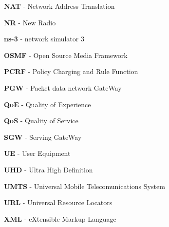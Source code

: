 \textbf{NAT} - Network Address Translation

\textbf{NR} - New Radio

\textbf{ns-3} - network simulator 3

\textbf{OSMF} - Open Source Media Framework

\textbf{PCRF} - Policy Charging and Rule Function

\textbf{PGW} - Packet data network GateWay

\textbf{QoE} - Quality of Experience

\textbf{QoS} - Quality of Service

\textbf{SGW} - Serving GateWay

\textbf{UE} - User Equipment

\textbf{UHD} - Ultra High Definition

\textbf{UMTS} - Universal Mobile Telecomunications System

\textbf{URL} - Universal Resource Locators

\textbf{XML} - eXtensible Markup Language


\cleardoublepage
